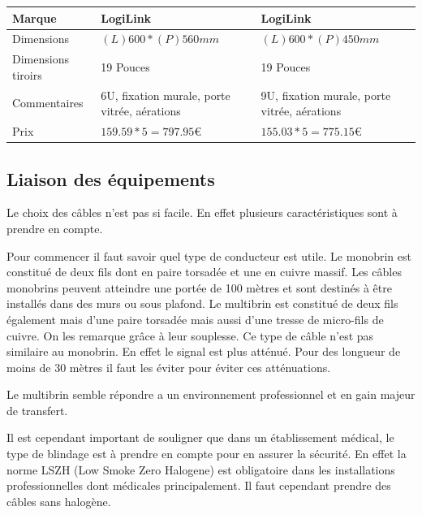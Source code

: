     \begin{center}
        \begin{tabular}{|l|p{5cm}|p{5cm}|}
          \hline
            Marque  & LogiLink
    &   LogiLink
 \\
          \hline
Dimensions
  &
$(L)600 * (P)560 mm$
    & $ (L)600 * (P)450 mm $

 \\
          \hline
Dimensions tiroirs
  & 19 Pouces
    & 19 Pouces
 \\
          \hline
            Commentaires   & 6U, fixation murale, porte vitrée, aérations & 9U, fixation murale, porte vitrée, aérations
                  \\
        \hline
            Prix &
$ 159.59 * 5 = 797.95   \euro   $
    &
$ 155.03 * 5 = 775.15  \euro   $
 \\
          \hline
        \end{tabular}
    \end{center}





\subsection{Liaison des équipements}

Le choix des câbles n'est pas si facile. En effet plusieurs caractéristiques sont à prendre en compte.

Pour commencer il faut savoir quel type de conducteur est utile.
Le monobrin est constitué de deux fils dont en paire torsadée et une en cuivre massif. Les câbles monobrins peuvent atteindre une portée de 100 mètres et sont destinés à être installés dans des murs ou sous plafond.
Le multibrin est constitué de deux fils également mais d'une paire torsadée mais aussi d'une tresse de micro-fils de cuivre. On les remarque grâce à leur souplesse. Ce type de câble n'est pas similaire au monobrin. En effet le signal est plus atténué. Pour des longueur de moins de 30 mètres il faut les éviter pour éviter ces atténuations.

Le multibrin semble répondre a un environnement professionnel et en gain majeur de transfert.

Il est cependant important de souligner que dans un établissement médical, le type de blindage est à prendre en compte pour en assurer la sécurité. En effet la norme LSZH (Low Smoke Zero Halogene) est obligatoire dans les installations professionnelles dont médicales principalement. Il faut cependant prendre des câbles sans halogène.

